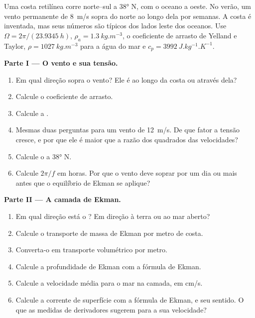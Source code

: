 \begin{problem}
\label{pb:b1:ocean-circulation:1}
Uma costa retilínea corre norte--sul a \ang{38} N, com o oceano a oeste. No
verão, um vento permanente de \qty{8}{m/s} sopra do norte ao longo dela por semanas. A
costa é inventada, mas seus números são típicos dos lados leste dos oceanos.
Use $\Omega = 2\pi/(\qty{23.9345}{h})$, $\rho_a = \qty{1.3}{kg.m^{-3}}$, o coeficiente de arrasto
de Yelland e Taylor, $\rho = \qty{1027}{kg.m^{-3}}$ para a água do mar e
$c_p = \qty{3992}{J.kg^{-1}.K^{-1}}$.

\medskip
\noindent\textbf{Parte I --- O vento e sua tensão.}
\begin{enumerate}
  \item Em qual direção sopra o vento? Ele é ao longo da costa ou através
        dela?
  \item Calcule o coeficiente de arrasto.
  \item Calcule a .
  \item Mesmas duas perguntas para um vento de \qty{12}{m/s}. De que fator a
        tensão cresce, e por que ele é maior que a razão dos quadrados das velocidades?
  \item Calcule o  a \ang{38} N.
  \item Calcule $2\pi/f$ em horas. Por que o vento deve soprar por um dia ou mais antes
        que o equilíbrio de Ekman se aplique?
\end{enumerate}

\medskip
\noindent\textbf{Parte II --- A camada de Ekman.}
\begin{enumerate}[resume]
  \item Em qual direção está o ? Em direção à terra ou ao mar aberto?
  \item Calcule o transporte de massa de Ekman por metro de costa.
  \item Converta-o em transporte volumétrico por metro.
  \item Calcule a profundidade de Ekman com a fórmula de Ekman.
  \item Calcule a velocidade média para o mar na camada, em \unit{cm/s}.
  \item Calcule a corrente de superfície com a fórmula de Ekman, e seu sentido. O que
        as medidas de derivadores sugerem para a sua velocidade?
\end{enumerate}


\end{problem}
